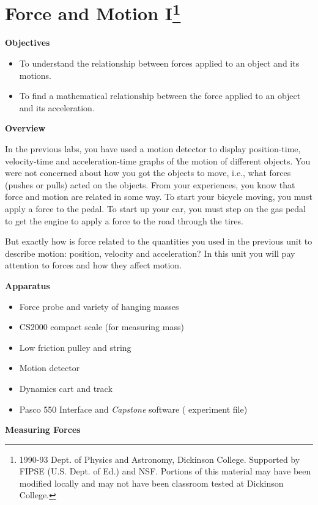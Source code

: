 
\section{Force and Motion I\footnote{
1990-93 Dept. of Physics and Astronomy, Dickinson College. Supported by FIPSE
(U.S. Dept. of Ed.) and NSF. Portions of this material may have been modified
locally and may not have been classroom tested at Dickinson College.
}}

\makelabheader %

\medskip
\textbf{Objectives }

\begin{itemize}[nosep]
\item To understand the relationship between forces applied to an object and its motions. 
\item To find a mathematical relationship between the force applied to an object and its acceleration.
\end{itemize}
\textbf{Overview }

In the previous labs, you have used a motion detector to display position-time,
velocity-time and acceleration-time graphs of the motion of different objects.
You were not concerned about how you got the objects to move, i.e., what forces
(pushes or pulls) acted on the objects. From your experiences, you know that
force and motion are related in some way. To start your bicycle moving, you
must apply a force to the pedal. To start up your car, you must step on the
gas pedal to get the engine to apply a force to the road through the tires.

But exactly how is force related to the quantities you used in the previous
unit to describe motion: position, velocity and acceleration? In this unit you
will pay attention to forces and how they affect motion. 

\medskip
\textbf{Apparatus} 

\begin{itemize} [nosep]
\item Force probe and variety of hanging masses 
\item CS2000 compact scale (for measuring mass)
\item Low friction pulley and string 
\item Motion detector 
\item Dynamics cart and track 
\item Pasco 550 Interface and \textit{Capstone} software ( experiment file)
\end{itemize}
\textbf{Measuring Forces} 


